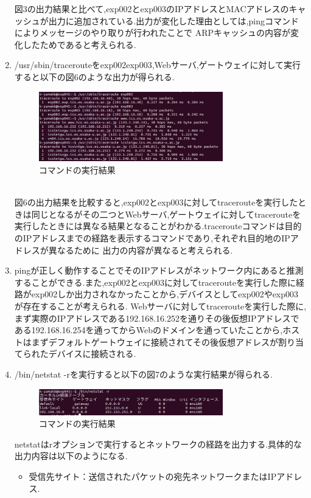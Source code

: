 \documentclass[dvipdfmx]{jarticle}
\begin{document}
\begin{enumerate}
    図3の出力結果と比べて,exp002とexp003のIPアドレスとMACアドレスのキャッシュが出力に追加されている.出力が変化した理由としては,pingコマンドによりメッセージのやり取りが行われたことで
    ARPキャッシュの内容が変化したためであると考えられる.
    \item /usr/sbin/tracerouteをexp002exp003,Webサーバ,ゲートウェイに対して実行すると以下の図6のような出力が得られる.
    \begin{figure}[h]
        \centering
        \includegraphics[width=8cm]{1-2-6.png}
        \caption{コマンドの実行結果}
    \end{figure}
    \\図6の出力結果を比較すると,exp002とexp003に対してtracerouteを実行したときは同じとなるがその二つとWebサーバ,ゲートウェイに対してtracerouteを
    実行したときには異なる結果となることがわかる.tracerouteコマンドは目的のIPアドレスまでの経路を表示するコマンドであり,それぞれ目的地のIPアドレスが異なるために
    出力の内容が異なると考えられる.
    \item pingが正しく動作することでそのIPアドレスがネットワーク内にあると推測することができる.また,exp002とexp003に対してtracerouteを実行した際に経路がexp002しか出力されなかったことから,デバイスとしてexp002やexp003が存在することが考えられる.
    Webサーバに対してtracerouteを実行した際に,まず実際のIPアドレスである192.168.16.252を通りその後仮想IPアドレスである192.168.16.254を通ってからWebのドメインを通っていたことから,ホストはまずデフォルトゲートウェイに接続されてその後仮想アドレスが割り当てられたデバイスに接続される.
    \item /bin/netstat -rを実行すると以下の図7のような実行結果が得られる.
    \begin{figure}[h]
        \centering
        \includegraphics[width=8cm]{1-2-8.png}
        \caption{コマンドの実行結果}
    \end{figure}
    netstatはrオプションで実行するとネットワークの経路を出力する.具体的な出力内容は以下のようになる.
    \begin{itemize}
        \item 受信先サイト：送信されたパケットの宛先ネットワークまたはIPアドレス.

\end{itemize}
\end{enumerate}
\end{document}
